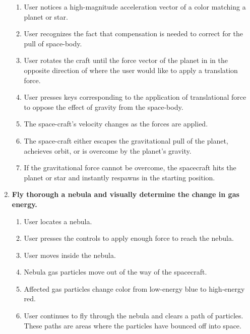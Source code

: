 \begin{enumerate}
\begin{enumerate}
  \item User notices a high-magnitude acceleration vector of a color matching a planet or star.

  \item User recognizes the fact that compensation is needed to correct for the pull of space-body.

  \item User rotates the craft until the force vector of the planet in in the opposite direction of where the user would like to apply a translation force.

  \item User presses keys corresponding to the application of translational force to oppose the effect of gravity from the space-body.

  \item The space-craft's velocity changes as the forces are applied.

  \item The space-craft either escapes the gravitational pull of the planet, acheieves orbit, or is overcome by the planet's gravity.

  \item If the gravitational force cannot be overcome, the spacecraft hits the planet or star and instantly respawns in the starting position.

\end{enumerate}

\item\textbf{Fly thorough a nebula and visually determine the change in gas energy.}
\begin{enumerate}

  \item User locates a nebula.

  \item User presses the controls to apply enough force to reach the nebula.

  \item User moves inside the nebula.

  \item Nebula gas particles move out of the way of the spacecraft.

  \item Affected gas particles change color from low-energy blue to high-energy red.

  \item User continues to fly through the nebula and clears a path of particles.  These paths are areas where the particles have bounced off into space.


\end{enumerate}
\end{enumerate}
